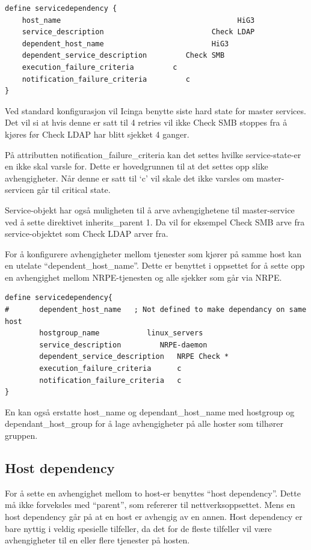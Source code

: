 \begin{lstlisting}
define servicedependency {
	host_name                                         HiG3
	service_description                         Check LDAP
	dependent_host_name                         HiG3
	dependent_service_description         Check SMB
	execution_failure_criteria         c
	notification_failure_criteria         c
}
\end{lstlisting}

Ved standard konfigurasjon vil Icinga benytte siste hard state for master services. Det vil si at hvis denne er satt til 4 retries vil ikke Check SMB stoppes fra å kjøres før Check LDAP har blitt sjekket 4 ganger. 

På attributten notification\_failure\_criteria kan det settes hvilke service-state-er en ikke skal varsle for. Dette er hovedgrunnen til at det settes opp slike avhengigheter. Når denne er satt til ‘c’ vil skale det ikke varsles om master-servicen går til critical state.

Service-objekt har også muligheten til å arve avhengighetene til master-service ved å sette direktivet inherits\_parent 1. Da vil for eksempel Check SMB arve fra service-objektet som Check LDAP arver fra.

For å konfigurere avhengigheter mellom tjenester som kjører på samme host kan en utelate “dependent\_host\_name”. Dette er benyttet i oppsettet for å sette opp en avhengighet mellom NRPE-tjenesten og alle sjekker som går via NRPE.

\begin{lstlisting}
define servicedependency{
#       dependent_host_name   ; Not defined to make dependancy on same host            
        hostgroup_name           linux_servers
        service_description         NRPE-daemon
        dependent_service_description   NRPE Check *
        execution_failure_criteria      c
        notification_failure_criteria   c
}
\end{lstlisting}

En kan også erstatte host\_name og dependant\_host\_name med hostgroup og dependant\_host\_group for å lage avhengigheter på alle hoster som tilhører gruppen.

\subsection{Host dependency}

For å sette en avhengighet mellom to host-er benyttes “host dependency”. Dette må ikke forveksles med “parent”, som refererer til nettverksoppsettet. Mens en host dependency går på at en host er avhengig av en annen. Host dependency er bare nyttig i veldig spesielle tilfeller, da det for de fleste tilfeller vil være avhengigheter til en eller flere tjenester på hosten. 

